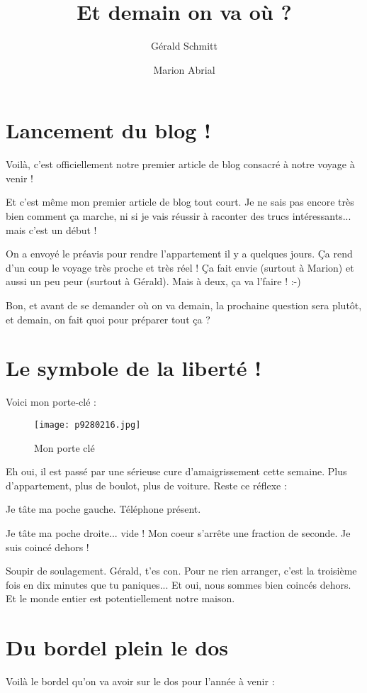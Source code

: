 \documentclass{book}
\title{Et demain on va où ?}
\author{Gérald Schmitt \and Marion Abrial}
\begin{document}
\maketitle

\chapter{Lancement du blog !}
Voilà, c'est officiellement notre premier article de blog consacré à notre voyage à venir !

Et c'est même mon premier article de blog tout court. Je ne sais pas encore très bien comment ça marche, ni si je vais réussir à raconter des trucs intéressants... mais c'est un début !

On a envoyé le préavis pour rendre l'appartement il y a quelques jours. Ça rend d'un coup le voyage très proche et très réel ! Ça fait envie (surtout à Marion) et aussi un peu peur (surtout à Gérald). Mais à deux, ça va l'faire ! :-)

Bon, et avant de se demander où on va demain, la prochaine question sera plutôt, et demain, on fait quoi pour préparer tout ça ?

\chapter{Le symbole de la liberté !}
Voici mon porte-clé :


\begin{figure}[h]
\centering
\texttt{[image: p9280216.jpg]}
\caption*{Mon porte clé}
\end{figure}

Eh oui, il est passé par une sérieuse cure d'amaigrissement cette semaine. Plus d'appartement, plus de boulot, plus de voiture.
Reste ce réflexe :

Je tâte ma poche gauche. Téléphone présent.

Je tâte ma poche droite... vide ! Mon coeur s'arrête une fraction de seconde. Je suis coincé dehors !

Soupir de soulagement. Gérald, t'es con. Pour ne rien arranger, c'est la troisième fois en dix minutes que tu paniques...
Et oui, nous sommes bien coincés dehors. Et le monde entier est potentiellement notre maison.

\chapter{Du bordel plein le dos}
Voilà le bordel qu'on va avoir sur le dos pour l'année à venir :
\end{document}
